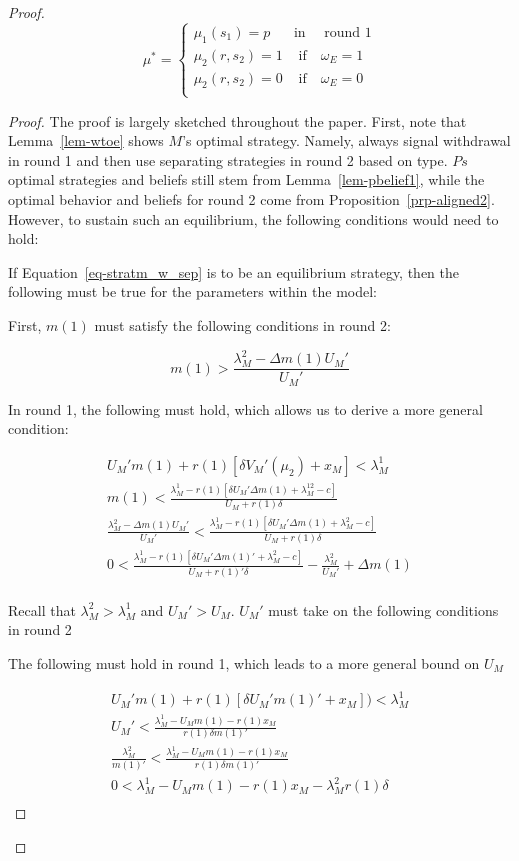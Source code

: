 \documentclass[
  12pt,
]{article}
\theoremstyle{plain}
\theoremstyle{plain}
\theoremstyle{remark}
\begin{document}
\begin{proof}
\[
\mu^* = 
\begin{cases}
\mu_1(s_1) = p  & \text{in } \quad \text{round 1}\\
\mu_2(r, s_2) = 1 & \text{ if} \quad \omega_E = 1\\
\mu_2(r, s_2) = 0 & \text{ if} \quad \omega_E = 0\\
\end{cases}
\]

\begin{proof}
The proof is largely sketched throughout the paper. First, note that
Lemma~\ref{lem-wtoe} shows \(M\)'s optimal strategy. Namely, always
signal withdrawal in round 1 and then use separating strategies in round
2 based on type. \(Ps\) optimal strategies and beliefs still stem from
Lemma~\ref{lem-pbelief1}, while the optimal behavior and beliefs for
round 2 come from Proposition~\ref{prp-aligned2}. However, to sustain
such an equilibrium, the following conditions would need to hold:

If Equation~\ref{eq-stratm_w_sep} is to be an equilibrium strategy, then
the following must be true for the parameters within the model:

First, \(m(1)\) must satisfy the following conditions in round 2:

\[
m(1) > \frac{\lambda_M^2- \Delta m(1) U_M'}{U_M'}
\]

In round 1, the following must hold, which allows us to derive a more
general condition:

\[
\begin{aligned}
U_M' m(1) + r(1)[\delta V_M'(\mu_2) + x_M] < \lambda_M^1\\
m(1) < \frac{\lambda_M^1 - r(1)[\delta U_M' \Delta m(1) + \lambda_M^12 - c]}{U_M + r(1) \delta} \\
\frac{\lambda_M^2- \Delta m(1) U_M'}{U_M'} <  \frac{\lambda_M^1 - r(1)[\delta U_M' \Delta m(1) + \lambda_M^2 - c]}{U_M + r(1) \delta}\\
 0<\frac{\lambda_M^1- r(1)[\delta U_M' \Delta m(1)' +\lambda_M^2- c]}{U_M + r(1)' \delta} - \frac{\lambda_M^2}{U_M'} + \Delta m(1) \\
\end{aligned}
\]

Recall that \(\lambda_M^2 > \lambda_M^1\) and \(U_M' > U_M\). \(U_M'\)
must take on the following conditions in round 2

The following must hold in round 1, which leads to a more general bound
on \(U_M\)

\[
\begin{aligned}
U_M' m(1) + r(1)[\delta U_M' m(1)' + x_M]) < \lambda_M^1\\
U_M' < \frac{\lambda_M^1 - U_M m(1) - r(1) x_M}{r(1) \delta m(1)'} \\
\frac{\lambda_M^2}{m(1)'} < \frac{\lambda_M^1- U_M m(1) - r(1) x_M}{r(1) \delta m(1)'} \\
0 < \lambda_M^1- U_M m(1) - r(1) x_M - \lambda_M^2r(1) \delta \\
\end{aligned}
\]


\end{proof}
\end{proof}
\end{document}
